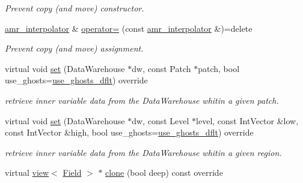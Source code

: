 \begin{DoxyCompactItemize}
\begin{DoxyCompactList}\small\item\em Prevent copy (and move) constructor. \end{DoxyCompactList}\item 
\hyperlink{classUintah_1_1PhaseField_1_1detail_1_1amr__interpolator}{amr\+\_\+interpolator} \& \hyperlink{classUintah_1_1PhaseField_1_1detail_1_1amr__interpolator_3_01ScalarField_3_01T_01_4_00_01Problem71844444bc14a03c0566689b6b502040_a9e873656c2c7deea8645541176e8b752}{operator=} (const \hyperlink{classUintah_1_1PhaseField_1_1detail_1_1amr__interpolator}{amr\+\_\+interpolator} \&)=delete
\begin{DoxyCompactList}\small\item\em Prevent copy (and move) assignment. \end{DoxyCompactList}\item 
virtual void \hyperlink{classUintah_1_1PhaseField_1_1detail_1_1amr__interpolator_3_01ScalarField_3_01T_01_4_00_01Problem71844444bc14a03c0566689b6b502040_aa8b73dcc7d87c412ecb5540689d33fe9}{set} (Data\+Warehouse $\ast$dw, const Patch $\ast$patch, bool use\+\_\+ghosts=\hyperlink{classUintah_1_1PhaseField_1_1detail_1_1amr__interpolator_3_01ScalarField_3_01T_01_4_00_01Problem71844444bc14a03c0566689b6b502040_ad1c55bf968b88ce13f275aa631a69cf7}{use\+\_\+ghosts\+\_\+dflt}) override
\begin{DoxyCompactList}\small\item\em retrieve inner variable data from the Data\+Warehouse whitin a given patch. \end{DoxyCompactList}\item 
virtual void \hyperlink{classUintah_1_1PhaseField_1_1detail_1_1amr__interpolator_3_01ScalarField_3_01T_01_4_00_01Problem71844444bc14a03c0566689b6b502040_af37070317967e41c06604969034c2f71}{set} (Data\+Warehouse $\ast$dw, const Level $\ast$level, const Int\+Vector \&low, const Int\+Vector \&high, bool use\+\_\+ghosts=\hyperlink{classUintah_1_1PhaseField_1_1detail_1_1amr__interpolator_3_01ScalarField_3_01T_01_4_00_01Problem71844444bc14a03c0566689b6b502040_ad1c55bf968b88ce13f275aa631a69cf7}{use\+\_\+ghosts\+\_\+dflt}) override
\begin{DoxyCompactList}\small\item\em retrieve inner variable data from the Data\+Warehouse whitin a given region. \end{DoxyCompactList}\item 
virtual \hyperlink{classUintah_1_1PhaseField_1_1detail_1_1view}{view}$<$ \hyperlink{structUintah_1_1PhaseField_1_1ScalarField}{Field} $>$ $\ast$ \hyperlink{classUintah_1_1PhaseField_1_1detail_1_1amr__interpolator_3_01ScalarField_3_01T_01_4_00_01Problem71844444bc14a03c0566689b6b502040_ad67d51ec30f811cb8e8ac5c6a87c97e1}{clone} (bool deep) const override

\end{DoxyCompactItemize}
